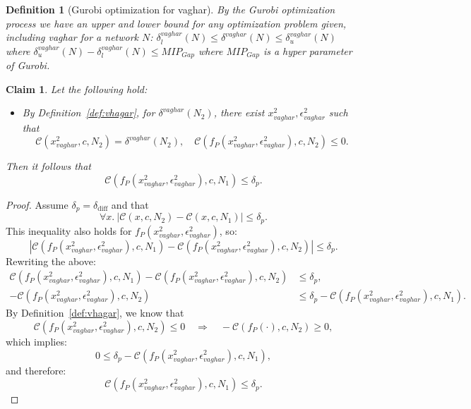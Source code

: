 \documentclass[11pt]{article}
\newtheorem{definition}{Definition}
\newtheorem{claim}{Claim}
\begin{document}
\begin{definition}[Gurobi optimization for vaghar]\label{def:delta_u_delta_l}
By the Gurobi optimization process we have an upper and lower bound for any optimization problem given, including vaghar for a network $N$: $\delta_l^{vaghar}(N) \leq \delta^{vaghar}(N) \leq \delta_u^{vaghar}(N)$ where $\delta_u^{vaghar}(N)-\delta_l^{vaghar}(N)\leq MIP_{Gap}$ where $MIP_{Gap}$ is a hyper parameter of Gurobi.
\end{definition}

\begin{claim}\label{claim:x2_eps_N1}
Let the following hold:
\begin{itemize}
    \item By Definition~\ref{def:vhagar}, for $\delta^{vaghar}(N_2)$, there exist $x^2_{vaghar}, \epsilon^2_{vaghar}$ such that
    \[
    \mathcal{C}(x^2_{vaghar}, c, N_2) = \delta^{vaghar}(N_2),\quad \mathcal{C}(f_P(x^2_{vaghar}, \epsilon^2_{vaghar}), c, N_2) \leq 0.
    \]
\end{itemize}
Then it follows that
\[
\mathcal{C}(f_P(x^2_{vaghar}, \epsilon^2_{vaghar}), c, N_1) \leq \delta_p.
\]
\end{claim}

\begin{proof}
Assume $\delta_p = \delta_{\text{diff}}$ and that
\[
\forall x.\ |\mathcal{C}(x, c, N_2) - \mathcal{C}(x, c, N_1)| \leq \delta_p.
\]
This inequality also holds for $f_P(x^2_{vaghar}, \epsilon^2_{vaghar})$, so:
\[
|\mathcal{C}(f_P(x^2_{vaghar}, \epsilon^2_{vaghar}), c, N_1) - \mathcal{C}(f_P(x^2_{vaghar}, \epsilon^2_{vaghar}), c, N_2)| \leq \delta_p.
\]
Rewriting the above:
\begin{align*}
\mathcal{C}(f_P(x^2_{vaghar}, \epsilon^2_{vaghar}), c, N_1) - \mathcal{C}(f_P(x^2_{vaghar}, \epsilon^2_{vaghar}), c, N_2) &\leq \delta_p, \\
-\mathcal{C}(f_P(x^2_{vaghar}, \epsilon^2_{vaghar}), c, N_2) &\leq \delta_p - \mathcal{C}(f_P(x^2_{vaghar}, \epsilon^2_{vaghar}), c, N_1).
\end{align*}
By Definition~\ref{def:vhagar}, we know that
\[
\mathcal{C}(f_P(x^2_{vaghar}, \epsilon^2_{vaghar}), c, N_2) \leq 0 \quad \Rightarrow \quad -\mathcal{C}(f_P(\cdot), c, N_2) \geq 0,
\]
which implies:
\[
0 \leq \delta_p - \mathcal{C}(f_P(x^2_{vaghar}, \epsilon^2_{vaghar}), c, N_1),
\]
and therefore:
\[
\mathcal{C}(f_P(x^2_{vaghar}, \epsilon^2_{vaghar}), c, N_1) \leq \delta_p.
\]
\end{proof}
\end{document}
